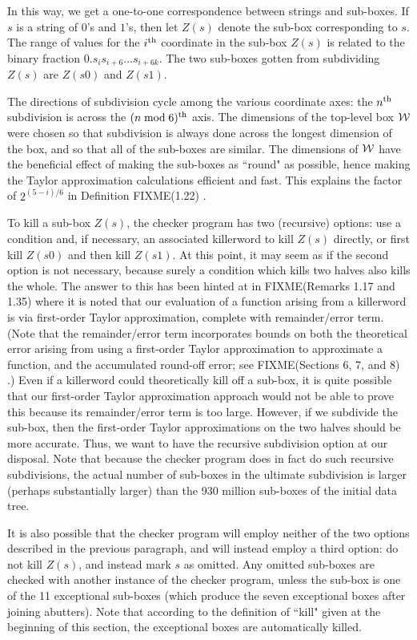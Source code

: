 In this way, we get a one-to-one correspondence
between strings and sub-boxes.
If $s$ is a string of $0$'s and $1$'s, then let $Z(s)$ denote
the sub-box corresponding to $s$.
The range of values for the $i^{\rm th}$ coordinate in the sub-box $Z(s)$ is related
to the binary fraction $0.s_{i}s_{i+6}\ldots s_{i+6k}$.
The two sub-boxes gotten from
subdividing $Z(s)$ are $Z(s0)$ and $Z(s1)$.

The directions of subdivision cycle among the various coordinate axes:
the $n^{\rm th}$ subdivision is across the $(n \bmod 6)^{\rm th}$ axis.
The dimensions of the top-level box ${\cal W}$ were chosen so that subdivision
is always done across the longest dimension of the box,
and so that all of the sub-boxes are similar.  
The dimensions of ${\cal W}$ have the beneficial effect of making the sub-boxes as ``round" as possible, hence making the Taylor approximation calculations efficient and fast.
This explains the factor of $2^{(5-i)/6}$ in Definition 
FIXME(1.22)
.

To kill a sub-box $Z(s)$, the checker program has two (recursive) options:
use a condition and, if necessary, an associated killerword  to kill $Z(s)$ directly, or first kill $Z(s0)$ and then kill $Z(s1)$.
At this point, it may seem as if the second option is not necessary,
because surely a condition which kills two halves also kills the whole.
The answer to this has been hinted at in 
FIXME(Remarks 1.17 and 1.35)
 where
it is noted that our evaluation of a function arising
from a killerword  is via first-order Taylor
approximation, complete with remainder/error term.
(Note that the remainder/error term incorporates bounds on
both the theoretical error arising from using a first-order Taylor
approximation to approximate a function, and the accumulated
round-off error; see 
FIXME(Sections 6, 7,  and 8)
.)
Even if a killerword could theoretically kill off a sub-box,
it is quite possible that our
first-order Taylor approximation approach would not be
able to prove this 
because its remainder/error term is too large.
However, if we subdivide the sub-box, then the first-order
Taylor approximations on the two halves should be more accurate.  
Thus,
we want to have the recursive subdivision option at our
disposal.
Note that because the checker program does in fact do such 
recursive subdivisions, the actual number of sub-boxes in the
ultimate subdivision is larger (perhaps substantially larger)
than the 930 million sub-boxes of the initial data tree.

It is also possible that the checker program will employ
neither of the two options described in the previous
paragraph, and will instead employ  
a third option: do not kill $Z(s)$, and instead
mark $s$ as omitted.
Any omitted sub-boxes are checked with another instance
of the checker program,
unless the sub-box is one of the 11 exceptional
sub-boxes (which produce the seven exceptional boxes after joining abutters).
Note that according to the definition of ``kill" given at the beginning of this section, the exceptional boxes are
automatically killed.   

